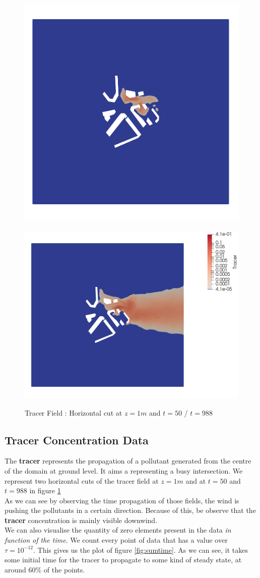 \begin{figure}[h!]
\centering
  \includegraphics[height=0.4\linewidth]{figures/Analysis/tracer050cutZ1}
~
  \includegraphics[height=0.4\linewidth]{figures/Analysis/tracer988cutZ1}
  \caption{Tracer Field : Horizontal cut at $z=1m$ and  $t=50$ / $t=988$}
  \label{fig:view:tracerend}
\end{figure}

 \subsection{Tracer Concentration Data}


The \textbf{tracer} represents the propagation of a pollutant generated from the centre of the domain at ground level. It aims a representing a busy intersection. We represent two horizontal cuts of the tracer field at $z=1m$ and at $t=50$ and $t=988$ in figure \ref{fig:view:tracerend}\\


As we can see by observing the time propagation of those fields,  the wind is pushing the pollutants in a certain direction. Because of this, be observe that the \textbf{tracer} concentration is mainly visible downwind. \\


We can also visualise the quantity of zero elements present in the data \textit{in function of the time}. We count every point of data that has a value over $\tau = 10^{-12}$. This gives us the plot of figure \ref{fig:sumtime}. As we can see, it takes some initial time for the tracer to propagate to some kind of steady state, at around 60\% of the points. \\

